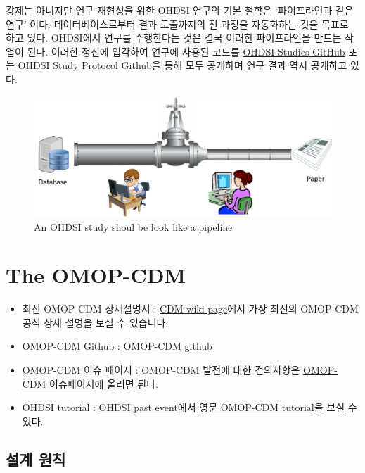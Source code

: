 \documentclass[]{book}
\providecommand{\tightlist}{%
  \setlength{\itemsep}{0pt}\setlength{\parskip}{0pt}}
\begin{document}
강제는 아니지만 연구 재현성을 위한 OHDSI 연구의 기본 철학은 `파이프라인과 같은 연구' 이다. 데이터베이스로부터 결과 도출까지의 전 과정을 자동화하는 것을 목표로 하고 있다. OHDSI에서 연구를 수행한다는 것은 결국 이러한 파이프라인을 만드는 작업이 된다. 이러한 정신에 입각하여 연구에 사용된 코드를 \href{https://github.com/OHDSI/OhdsiStudies}{OHDSI Studies GitHub} 또는 \href{https://github.com/OHDSI/StudyProtocols}{OHDSI Study Protocol Github}을 통해 모두 공개하며 \href{http://data.ohdsi.org/}{연구 결과} 역시 공개하고 있다.

\begin{figure}
\includegraphics[width=0.8\linewidth]{images/OhdsiCommunity/study_pipeline} \caption{An OHDSI study shoul be look like a pipeline}\label{fig:ohdsiStudyShouldBeLookLikeAPipeline}
\end{figure}

\hypertarget{omopCdm}{%
\chapter{The OMOP-CDM}\label{omopCdm}}

\begin{itemize}
\tightlist
\item
  최신 OMOP-CDM 상세설명서 : \href{https://github.com/ohdsi/commondatamodel/wiki}{CDM wiki page}에서 가장 최신의 OMOP-CDM 공식 상세 설명을 보실 수 있습니다.
\item
  OMOP-CDM Github : \href{https://github.com/ohdsi/commondatamodel}{OMOP-CDM github}
\item
  OMOP-CDM 이슈 페이지 : OMOP-CDM 발전에 대한 건의사항은 \href{https://github.com/ohdsi/commondatamodel/issues}{OMOP-CDM 이슈페이지}에 올리면 된다.
\item
  OHDSI tutorial : \href{https://www.ohdsi.org/past-events/}{OHDSI past event}에서 \href{https://www.ohdsi.org/past-events/2018-tutorials-omop-common-data-model-and-standardized-vocabularies/}{영문 OMOP-CDM tutorial}을 보실 수 있다.
\end{itemize}

\hypertarget{section-1}{%
\section{설계 원칙}\label{section-1}}
\end{document}
